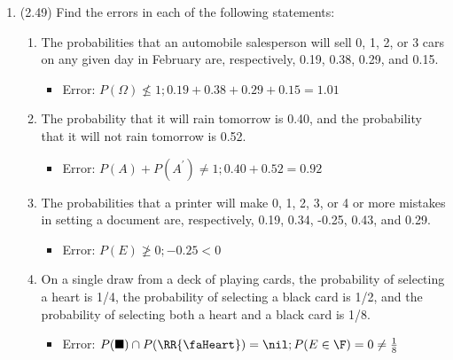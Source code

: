 \documentclass[basic, header]{nosvagor-notes} \usepackage{nosvagor-math}
\begin{document}
\begin{enumerate}[itemsep=8em]

  \item (2.49) Find the errors in each of the following statements:
  \begin{enumerate}

    \item The probabilities that an automobile salesperson will sell 0, 1, 2,
      or 3 cars on any given day in February are, respectively, 0.19, 0.38,
      0.29, and 0.15.
      \begin{itemize}
        \item Error: \(P(\Omega) \nleq 1; 0.19 + 0.38 + 0.29 + 0.15 = 1.01\)

      \end{itemize}


    \item The probability that it will rain tomorrow is 0.40, and the
      probability that it will not rain tomorrow is 0.52.
      \begin{itemize}
        \item Error: \(P(A) + P(A^{'}) \neq 1; 0.40 + 0.52 = 0.92 \)

      \end{itemize}


    \item The probabilities that a printer will make 0, 1, 2, 3, or 4 or more
      mistakes in setting a document are, respectively, 0.19, 0.34, -0.25,
      0.43, and 0.29.
      \begin{itemize}
        \item Error: \(P(E) \ngeq 0; -0.25 < 0\)

      \end{itemize}

    \item On a single draw from a deck of playing cards, the probability of
      selecting a heart is 1/4, the probability of selecting a black card is
      1/2, and the probability of selecting both a heart and a black card is
      1/8.
      \begin{itemize}
        \item Error: \(P(\blacksquare) \cap P(\text{\RR{\faHeart}}) = \nil; P(E \in \F) = 0 \neq \frac{1}{8}\)

      \end{itemize}

  \end{enumerate}


\end{enumerate}
\end{document}
